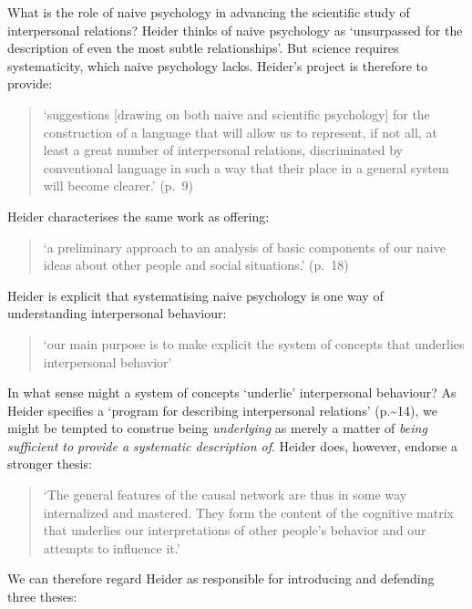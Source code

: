 \documentclass[12pt,\papersize]{extarticle}
\begin{document}
What is the role of naive psychology in advancing the scientific study of interpersonal relations? Heider thinks of naive psychology as `unsurpassed for the description of even the most subtle relationships'. But science requires systematicity, which naive psychology lacks. Heider's project is therefore to provide:

\begin{quote}
`suggestions {[}drawing on both naive and scientific psychology{]} for the construction of a language that will allow us to represent, if not all, at least a great number of interpersonal relations, discriminated by conventional language in such a way that their place in a general system will become clearer.' (p.~9)
\end{quote}

Heider characterises the same work as offering:

\begin{quote}
`a preliminary approach to an analysis of basic components of our naive ideas about other people and social situations.' (p.~18)
\end{quote}

Heider is explicit that systematising naive psychology is one way of understanding interpersonal behaviour:

\begin{quote}
`our main purpose is to make explicit the system of concepts that underlies interpersonal behavior' \citep[pp.~12]{heider:1958_psychology}
\end{quote}

In what sense might a system of concepts `underlie' interpersonal behaviour? As Heider specifies a `program for describing interpersonal relations' (p.\textasciitilde14), we might be tempted to construe being \emph{underlying} as merely a matter of \emph{being sufficient to provide a systematic description of}. Heider does, however, endorse a stronger thesis:

\begin{quote}
`The general features of the causal network are thus in some way internalized and mastered. They form the content of the cognitive matrix that underlies our interpretations of other people's behavior and our attempts to influence it.' \citep[pp.~297--8]{heider:1958_psychology}
\end{quote}

We can therefore regard Heider as responsible for introducing and defending three theses:
\end{document}
